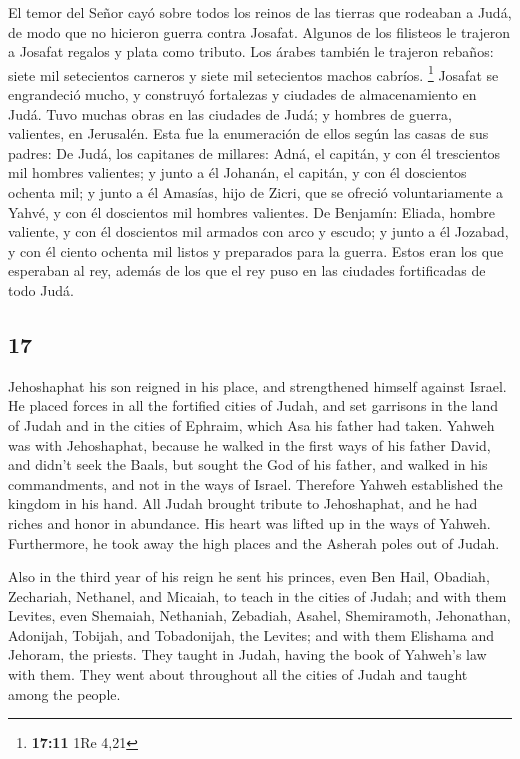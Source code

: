 \begin{paracol}{2}
 El temor del Señor cayó sobre todos los reinos de las
tierras que rodeaban a Judá, de modo que no hicieron guerra contra
Josafat.  Algunos de los filisteos le trajeron a Josafat
regalos y plata como tributo. Los árabes también le trajeron rebaños:
siete mil setecientos carneros y siete mil setecientos machos cabríos.
\footnote{\textbf{17:11} 1Re 4,21}  Josafat se
engrandeció mucho, y construyó fortalezas y ciudades de almacenamiento
en Judá.  Tuvo muchas obras en las ciudades de Judá; y
hombres de guerra, valientes, en Jerusalén.  Esta fue la
enumeración de ellos según las casas de sus padres: De Judá, los
capitanes de millares: Adná, el capitán, y con él trescientos mil
hombres valientes;  y junto a él Johanán, el capitán, y
con él doscientos ochenta mil;  y junto a él Amasías,
hijo de Zicri, que se ofreció voluntariamente a Yahvé, y con él
doscientos mil hombres valientes.  De Benjamín: Eliada,
hombre valiente, y con él doscientos mil armados con arco y escudo;
 y junto a él Jozabad, y con él ciento ochenta mil listos
y preparados para la guerra.  Estos eran los que
esperaban al rey, además de los que el rey puso en las ciudades
fortificadas de todo Judá.

\switchcolumn
\begin{otherlanguage}{english}

\hypertarget{section-33}{%
\section{17}\label{section-33}}

 Jehoshaphat his son reigned in his place, and
strengthened himself against Israel.  He placed forces in
all the fortified cities of Judah, and set garrisons in the land of
Judah and in the cities of Ephraim, which Asa his father had taken.
 Yahweh was with Jehoshaphat, because he walked in the
first ways of his father David, and didn't seek the Baals,
 but sought the God of his father, and walked in his
commandments, and not in the ways of Israel.  Therefore
Yahweh established the kingdom in his hand. All Judah brought tribute to
Jehoshaphat, and he had riches and honor in abundance. 
His heart was lifted up in the ways of Yahweh. Furthermore, he took away
the high places and the Asherah poles out of Judah.

 Also in the third year of his reign he sent his princes,
even Ben Hail, Obadiah, Zechariah, Nethanel, and Micaiah, to teach in
the cities of Judah;  and with them Levites, even
Shemaiah, Nethaniah, Zebadiah, Asahel, Shemiramoth, Jehonathan,
Adonijah, Tobijah, and Tobadonijah, the Levites; and with them Elishama
and Jehoram, the priests.  They taught in Judah, having
the book of Yahweh's law with them. They went about throughout all the
cities of Judah and taught among the people.


\end{otherlanguage}
\end{paracol}
